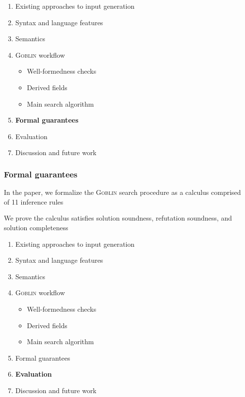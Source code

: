 \documentclass[11pt,xcolor={dvipsnames},hyperref={pdftex,pdfpagemode=UseNone,hidelinks,pdfdisplaydoctitle=true},usepdftitle=false]{beamer}
\newcommand{\system}{\textsc{Goblin}}
\newcommand{\green}[1]{\textcolor{green!60!black}{#1}}
\begin{document}
\begin{frame}
\begin{enumerate}
  \item Existing approaches to input generation
  \item Syntax and language features
  \item Semantics
  \item \system{} workflow
  \begin{itemize}
    \item Well-formedness checks
    \item Derived fields
    \item Main search algorithm
  \end{itemize}
  \item \green{\textbf{Formal guarantees}}
  \item Evaluation
  \item Discussion and future work
\end{enumerate}
\end{frame}

\begin{frame}
    \frametitle{Formal guarantees}
    In the paper, we formalize the \system{} search procedure as a calculus comprised of 11 inference rules \\[8pt] \pause

    We prove the calculus satisfies \green{solution soundness}, \green{refutation soundness}, 
    and \green{solution completeness}     
\end{frame}

\begin{frame}
\begin{enumerate}
  \item Existing approaches to input generation
  \item Syntax and language features
  \item Semantics
  \item \system{} workflow
  \begin{itemize}
    \item Well-formedness checks
    \item Derived fields
    \item Main search algorithm
  \end{itemize}
  \item Formal guarantees
  \item \green{\textbf{Evaluation}}
  \item Discussion and future work
\end{enumerate}
\end{frame}
\end{document}
